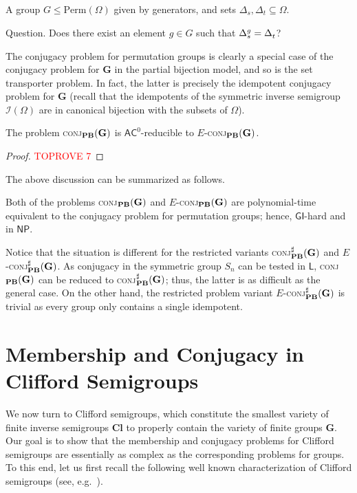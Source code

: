 \documentclass[anonymous,letter,UKenglish,cleveref,autoref,thm-restate]{lipics-v2021}
\makeatletter
\renewcommand{\leq}{\leqslant}
\newcommand{\eg}{e.g.~}
\newcommand{\sse}{\subseteq}
\newcommand{\ACz}{\ensuremath{\mathsf{AC}^0}\xspace}
\newcommand{\LOGSPACE}{\ensuremath{\mathsf{L}}\xspace}
\newcommand{\NP}{\ensuremath{\mathsf{NP}}\xspace}
\newcommand{\GI}{\ensuremath{\mathsf{GI}}}
\renewcommand{\L}{\LOGSPACE}
\newcommand{\vG}{\ensuremath{\mathbf{G}}}
\newcommand{\vCl}{\ensuremath{\mathbf{Cl}}}
\newcommand{\ISym}{\cI}
\newcommand{\Sym}{\mathrm{Perm}}
\newcommand{\cI}{\mathcal{I}}
\theoremstyle{plain}
\theoremstyle{plain}
\providecommand\iitem{}
\providecommand\qitem{}
\newcommand\decproblem@iitem@label{\rlap{Input.}\phantom{Question.}}
\newcommand\decproblem@qitem@label{Question.}
\newenvironment{decproblem}{\begin{description}\begin{samepage}\renewcommand{\iitem}{\item[\decproblem@iitem@label]}\renewcommand{\qitem}{\item[\decproblem@qitem@label]}}{\end{samepage}\end{description}}
\newcommand{\dConj}[2][]{\textup{\textsc{conj${}_{\mathbf{#1}}\expandafter\ifx\expandafter\relax\detokenize{#2}\relax\else(#2)\fi$}}}
\newcommand{\dConjS}[2][]{\textup{\textsc{conj${}^{\sharp}_{\mathbf{#1}}\expandafter\ifx\expandafter\relax\detokenize{#2}\relax\else(#2)\fi$}}}
\newcommand{\dEConj}[2][]{\ensuremath{E}\textnormal{-}\dConj[#1]{#2}}
\newcommand{\dEConjS}[2][]{\ensuremath{E}\textnormal{-}\dConjS[#1]{#2}}
\makeatother
\begin{document}
\begin{decproblem}
	\iitem A group $G \leq \Sym(\Omega)$ given by generators, and sets $\Delta_s, \Delta_t \sse \Omega$.
	\qitem Does there exist an element $g \in G$ such that $\Delta_s^g = \Delta^{\mathstrut}_t$?
\end{decproblem}

The conjugacy problem for permutation groups is clearly a special case of the conjugacy problem for $\vG$ in the partial bijection model, and so is the set transporter problem.
In fact, the latter is precisely the idempotent conjugacy problem for $\vG$ (recall that the idempotents of the symmetric inverse semigroup $\ISym(\Omega)$ are in canonical bijection with the subsets of $\Omega$).

\begin{lemma}
  The problem \dConj[PB]{\vG} is $\ACz$-reducible to \dEConj[PB]{\vG}.
\end{lemma}

\begin{proof}\textcolor{red}{TOPROVE 7}\end{proof}

The above discussion can be summarized as follows.

\begin{proposition}\label{pro:bpm-groups-conjugacy}
  Both of the problems \dConj[PB]{\vG} and \dEConj[PB]{\vG} are polynomial-time equivalent to the conjugacy problem for permutation groups; hence, \GI-hard and in \NP{}.
\end{proposition}

Notice that the situation is different for the restricted variants \dConjS[PB]{\vG} and \dEConjS[PB]{\vG}.
As conjugacy in the symmetric group $S_n$ can be tested in \L, \dConj[PB]{\vG} can be reduced to \dConjS[PB]{\vG}; thus, the latter is as difficult as the general case.
On the other hand, the restricted problem variant \dEConjS[PB]{\vG} is trivial as every group only contains a single idempotent.



\section{Membership and Conjugacy in Clifford Semigroups}\label{sec:clifford}

We now turn to Clifford semigroups, which constitute the smallest variety of finite inverse semigroups $\vCl$ to properly contain the variety of finite groups $\vG$.
Our goal is to show that the membership and conjugacy problems for Clifford semigroups are essentially as complex as the corresponding problems for groups.
To this end, let us first recall the following well known characterization of Clifford semigroups (see, \eg \cite{Petrich84,Law99}).
\end{document}
